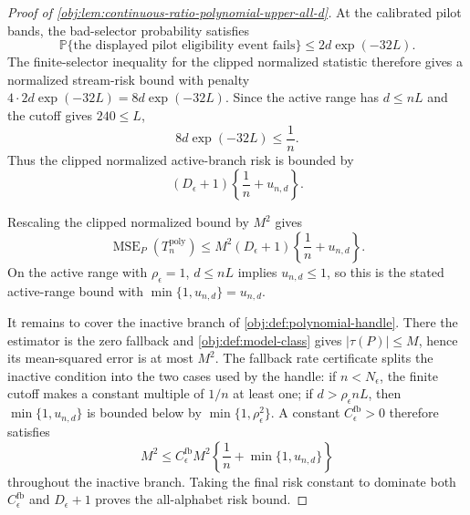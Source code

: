 \begin{proof}[Proof of \cref{obj:lem:continuous-ratio-polynomial-upper-all-d}]
At the calibrated pilot bands, the bad-selector probability satisfies
\[
\mathbb P\{\text{the displayed pilot eligibility event fails}\}
\le 2d\exp(-32L).
\]
The finite-selector inequality for the clipped normalized statistic therefore gives a normalized stream-risk bound with penalty \(4\cdot 2d\exp(-32L)=8d\exp(-32L)\).  Since the active range has \(d\le nL\) and the cutoff gives \(240\le L\),
\[
8d\exp(-32L)\le \frac1n.
\]
Thus the clipped normalized active-branch risk is bounded by
\[
(D_\epsilon+1)\left\{\frac1n+u_{n,d}\right\}.
\]

Rescaling the clipped normalized bound by \(M^2\) gives
\[
\operatorname{MSE}_{P}(T_n^{\mathrm{poly}})
\le
M^2(D_\epsilon+1)\left\{\frac1n+u_{n,d}\right\}.
\]
On the active range with \(\rho_\epsilon=1\), \(d\le nL\) implies \(u_{n,d}\le1\), so this is the stated active-range bound with \(\min\{1,u_{n,d}\}=u_{n,d}\). %

It remains to cover the inactive branch of \cref{obj:def:polynomial-handle}.  There the estimator is the zero fallback and \cref{obj:def:model-class} gives \(|\tau(P)|\le M\), hence its mean-squared error is at most \(M^2\).  The fallback rate certificate splits the inactive condition into the two cases used by the handle: if \(n<N_\epsilon\), the finite cutoff makes a constant multiple of \(1/n\) at least one; if \(d>\rho_\epsilon nL\), then \(\min\{1,u_{n,d}\}\) is bounded below by \(\min\{1,\rho_\epsilon^2\}\).  A constant \(C_{\epsilon}^{\mathrm{fb}}>0\) therefore satisfies
\[
M^2
\le
C_{\epsilon}^{\mathrm{fb}}M^2
\left\{\frac1n+\min\{1,u_{n,d}\}\right\}
\]
throughout the inactive branch.  Taking the final risk constant to dominate both \(C_{\epsilon}^{\mathrm{fb}}\) and \(D_\epsilon+1\) proves the all-alphabet risk bound. %
\end{proof}
